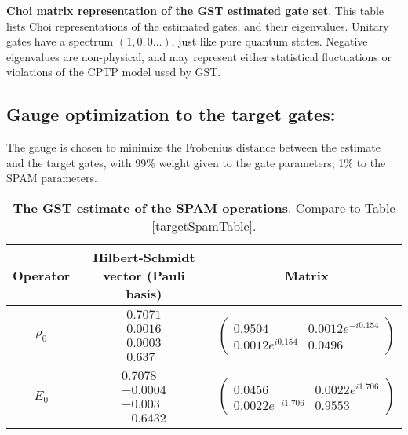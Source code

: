 {\begin{table}[h]
\begin{center}
\caption{\textbf{Choi matrix representation of the GST estimated gate set}.  This table lists Choi representations of the estimated gates, and their eigenvalues.  Unitary gates have a spectrum $(1,0,0\ldots)$, just like pure quantum states.  Negative eigenvalues are non-physical, and may represent either statistical fluctuations or violations of the CPTP model used by GST.\label{bestTargetSpamGatesetChoiTable}}
\end{center}
\end{table}

\clearpage

\subsection{Gauge optimization to the target gates:}
The gauge is chosen to minimize the Frobenius distance between the estimate and the target gates, with 99\% weight given to the gate parameters, 1\% to the SPAM parameters.


\begin{table}[h]
\begin{center}
\begin{tabular}[l]{|c|c|c|}
\hline
Operator & Hilbert-Schmidt vector (Pauli basis) & Matrix \\ \hline
$\rho_{0}$ & $ \begin{array}{c}
0.7071 \\ 
0.0016 \\ 
0.0003 \\ 
0.637
 \end{array} $
 & $ \left(\!\!\begin{array}{cc}
0.9504 & 0.0012e^{-i0.154} \\ 
0.0012e^{i0.154} & 0.0496
 \end{array}\!\!\right) $
 \\ \hline
$E_{0}$ & $ \begin{array}{c}
0.7078 \\ 
-0.0004 \\ 
-0.003 \\ 
-0.6432
 \end{array} $
 & $ \left(\!\!\begin{array}{cc}
0.0456 & 0.0022e^{i1.706} \\ 
0.0022e^{-i1.706} & 0.9553
 \end{array}\!\!\right) $
 \\ \hline
\end{tabular}

\caption{\textbf{The GST estimate of the SPAM operations}.  Compare to Table \ref{targetSpamTable}.\label{bestTargetGatesGatesetSpamTable}}
\end{center}
\end{table}

}
